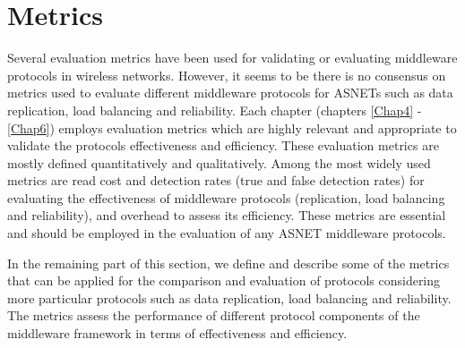 \section{Metrics}\label{Chap3_03}
Several evaluation metrics have been used for validating or evaluating middleware protocols in wireless networks. However, it seems to be there is no consensus on metrics used to evaluate different middleware protocols for ASNETs such as data replication, load balancing and reliability. Each chapter (chapters \ref{Chap4} - \ref{Chap6}) employs evaluation metrics which are highly relevant and appropriate to validate the protocols effectiveness and efficiency. These evaluation metrics are mostly defined quantitatively and qualitatively. Among the most widely used metrics are read cost and detection rates (true and false detection rates) for evaluating the effectiveness of middleware protocols (replication, load balancing and reliability), and overhead to assess its efficiency. These metrics are essential and should be employed in the evaluation of any ASNET middleware protocols.

In the remaining part of this section, we define and describe some of the metrics that can be applied for the comparison and evaluation of protocols considering more particular protocols such as data replication, load balancing and reliability. The metrics assess the performance of different protocol components of the middleware framework in terms of effectiveness and efficiency.

